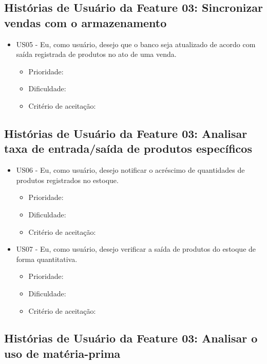 \subsection{Histórias de Usuário da Feature 03: Sincronizar vendas com o armazenamento}

\begin{itemize}

\item US05 - Eu, como usuário, desejo que o banco seja atualizado de acordo com saída registrada de produtos no ato de uma venda.
    \begin{itemize}
    \item Prioridade:
    \item Dificuldade:
    \item Critério de aceitação:
    \end{itemize}


\end{itemize}

\subsection{Histórias de Usuário da Feature 03: Analisar taxa de entrada/saída de produtos específicos}

\begin{itemize}

\item US06 - Eu, como usuário, desejo notificar o acréscimo de quantidades de produtos registrados no estoque.
    \begin{itemize}
    \item Prioridade:
    \item Dificuldade:
    \item Critério de aceitação:
    \end{itemize}


\item US07 - Eu, como usuário, desejo verificar a saída de produtos do estoque de forma quantitativa.
    \begin{itemize}
    \item Prioridade:
    \item Dificuldade:
    \item Critério de aceitação:
    \end{itemize}


\end{itemize}


\subsection{Histórias de Usuário da Feature 03: Analisar o uso de matéria-prima}

